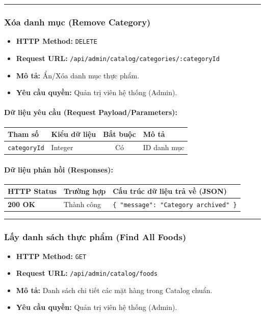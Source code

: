 \documentclass[12pt,a4paper]{article}
\begin{document}
\vskip 0.4cm
\noindent\rule{\textwidth}{0.3pt}
\vskip 0.4cm

\subsubsection{Xóa danh mục (Remove Category)}
\begin{itemize}[leftmargin=*]
    \item \textbf{HTTP Method:} \texttt{DELETE}
    \item \textbf{Request URL:} \texttt{/api/admin/catalog/categories/:categoryId}
    \item \textbf{Mô tả:} Ẩn/Xóa danh mục thực phẩm.
    \item \textbf{Yêu cầu quyền:} Quản trị viên hệ thống (Admin).
\end{itemize}

\paragraph{Dữ liệu yêu cầu (Request Payload/Parameters):}
\begin{longtable}{|p{2.8cm}|p{2.2cm}|c|p{7.0cm}|}
\hline
\textbf{Tham số} & \textbf{Kiểu dữ liệu} & \textbf{Bắt buộc} & \textbf{Mô tả} \\ \hline
\endhead
\texttt{categoryId} & Integer & Có & ID danh mục \\ \hline
\end{longtable}

\paragraph{Dữ liệu phản hồi (Responses):}
\begin{longtable}{|p{2.8cm}|p{3.2cm}|p{8.0cm}|}
\hline
\textbf{HTTP Status} & \textbf{Trường hợp} & \textbf{Cấu trúc dữ liệu trả về (JSON)} \\ \hline
\endhead
\textbf{200 OK} & Thành công & \texttt{\{ "message": "Category archived" \}} \\ \hline
\end{longtable}

\vskip 0.4cm
\noindent\rule{\textwidth}{0.3pt}
\vskip 0.4cm

\subsubsection{Lấy danh sách thực phẩm (Find All Foods)}
\begin{itemize}[leftmargin=*]
    \item \textbf{HTTP Method:} \texttt{GET}
    \item \textbf{Request URL:} \texttt{/api/admin/catalog/foods}
    \item \textbf{Mô tả:} Danh sách chi tiết các mặt hàng trong Catalog chuẩn.
    \item \textbf{Yêu cầu quyền:} Quản trị viên hệ thống (Admin).
\end{itemize}
\end{document}
